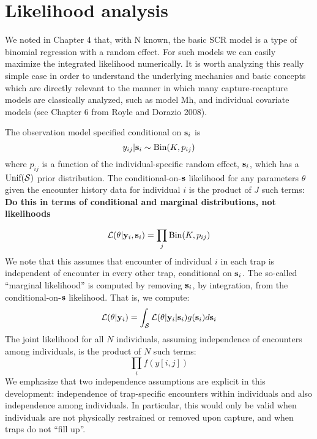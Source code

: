 \section{Likelihood analysis }

We noted in Chapter 4 that, with N known, the basic SCR model is a
type of binomial regression with a random effect. For such models we
can easily maximize the integrated likelihood numerically. It is worth
analyzing this really simple case in order to understand the
underlying mechanics and basic concepts which are directly relevant to
the manner in which many capture-recapture models are classically
analyzed, such as model Mh, and individual covariate models (see
Chapter 6 from Royle and Dorazio 2008).

The observation model specified conditional on ${\bf s}_{i}$ is 
\begin{equation}
	y_{ij}| {\bf s}_{i} \sim \mbox{Bin}(K, p_{ij})
\label{mle.eq.cond-on-s}
\end{equation}
where $p_{ij}$ is a function of the individual-specific random effect,
${\bf s}_{i}$, which has a $\mbox{Unif}({\cal S})$ prior distribution.  The
conditional-on-${\bf s}$ likelihood for any parameters $\theta$ given
the encounter history data for
individual $i$ is the product of $J$ such terms:
{\bf Do this in terms of conditional and marginal distributions, not likelihoods}

\[
     {\cal  L}( \theta | {\bold y}_{i} , {\bf s}_{i} ) =    \prod_{j} \mbox{Bin}(K, p_{ij})
\]
We note that this assumes that encounter of individual $i$ in each
trap is independent of encounter in every other trap, conditional on
${\bf s}_{i}$.  The so-called ``marginal likelihood'' is computed by removing
${\bf s}_{i}$, by integration, from the conditional-on-${\bf s}$ likelihood. That
is, we compute:
\[
         {\cal L}(\theta| {\bf y}_{i}) = 
\int_{{\cal S}} {\cal L}( \theta | {\bf y}_{i} |{\bf s}_{i}) g({\bf s}_{i}) d{\bf s}_{i}
\]
The joint likelihood for all $N$ individuals, assuming independence of
encounters among individuals, is the product of $N$ such terms:
\[
          \prod_{i}  f(y[i,j])
\]
We emphasize that two independence assumptions are explicit in this
development: independence of trap-specific encounters within
individuals and also independence among individuals. In particular,
this would only be valid when individuals are not physically
restrained or removed upon capture, and when traps do not “fill up”.

